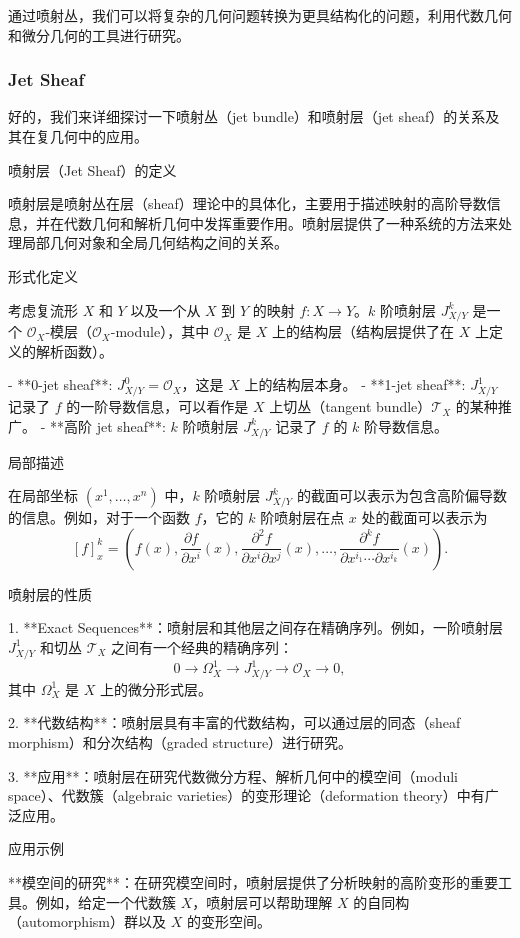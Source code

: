 \documentclass[lang=cn,12pt,a4paper,fontset=none]{beautybook}
\begin{document}
通过喷射丛，我们可以将复杂的几何问题转换为更具结构化的问题，利用代数几何和微分几何的工具进行研究。

\subsubsection*{Jet Sheaf}
好的，我们来详细探讨一下喷射丛（jet bundle）和喷射层（jet sheaf）的关系及其在复几何中的应用。

喷射层（Jet Sheaf）的定义

喷射层是喷射丛在层（sheaf）理论中的具体化，主要用于描述映射的高阶导数信息，并在代数几何和解析几何中发挥重要作用。喷射层提供了一种系统的方法来处理局部几何对象和全局几何结构之间的关系。

形式化定义

考虑复流形 $X$ 和 $Y$ 以及一个从 $X$ 到 $Y$ 的映射 $f: X \to Y$。$k$ 阶喷射层 $J^k_{X/Y}$ 是一个 $\mathcal{O}_X$-模层（$\mathcal{O}_X$-module），其中 $\mathcal{O}_X$ 是 $X$ 上的结构层（结构层提供了在 $X$ 上定义的解析函数）。

- **0-jet sheaf**: $J^0_{X/Y} = \mathcal{O}_X$，这是 $X$ 上的结构层本身。
- **1-jet sheaf**: $J^1_{X/Y}$ 记录了 $f$ 的一阶导数信息，可以看作是 $X$ 上切丛（tangent bundle）$\mathcal{T}_X$ 的某种推广。
- **高阶 jet sheaf**: $k$ 阶喷射层 $J^k_{X/Y}$ 记录了 $f$ 的 $k$ 阶导数信息。

局部描述

在局部坐标 $(x^1, \ldots, x^n)$ 中，$k$ 阶喷射层 $J^k_{X/Y}$ 的截面可以表示为包含高阶偏导数的信息。例如，对于一个函数 $f$，它的 $k$ 阶喷射层在点 $x$ 处的截面可以表示为
$$ [f]_x^k = \left( f(x), \frac{\partial f}{\partial x^i}(x), \frac{\partial^2 f}{\partial x^i \partial x^j}(x), \ldots, \frac{\partial^k f}{\partial x^{i_1} \cdots \partial x^{i_k}}(x) \right). $$

喷射层的性质

1. **Exact Sequences**：喷射层和其他层之间存在精确序列。例如，一阶喷射层 $J^1_{X/Y}$ 和切丛 $\mathcal{T}_X$ 之间有一个经典的精确序列：
   $$ 0 \to \Omega^1_X \to J^1_{X/Y} \to \mathcal{O}_X \to 0, $$
   其中 $\Omega^1_X$ 是 $X$ 上的微分形式层。

2. **代数结构**：喷射层具有丰富的代数结构，可以通过层的同态（sheaf morphism）和分次结构（graded structure）进行研究。

3. **应用**：喷射层在研究代数微分方程、解析几何中的模空间（moduli space）、代数簇（algebraic varieties）的变形理论（deformation theory）中有广泛应用。

应用示例

**模空间的研究**：在研究模空间时，喷射层提供了分析映射的高阶变形的重要工具。例如，给定一个代数簇 $X$，喷射层可以帮助理解 $X$ 的自同构（automorphism）群以及 $X$ 的变形空间。
\end{document}
